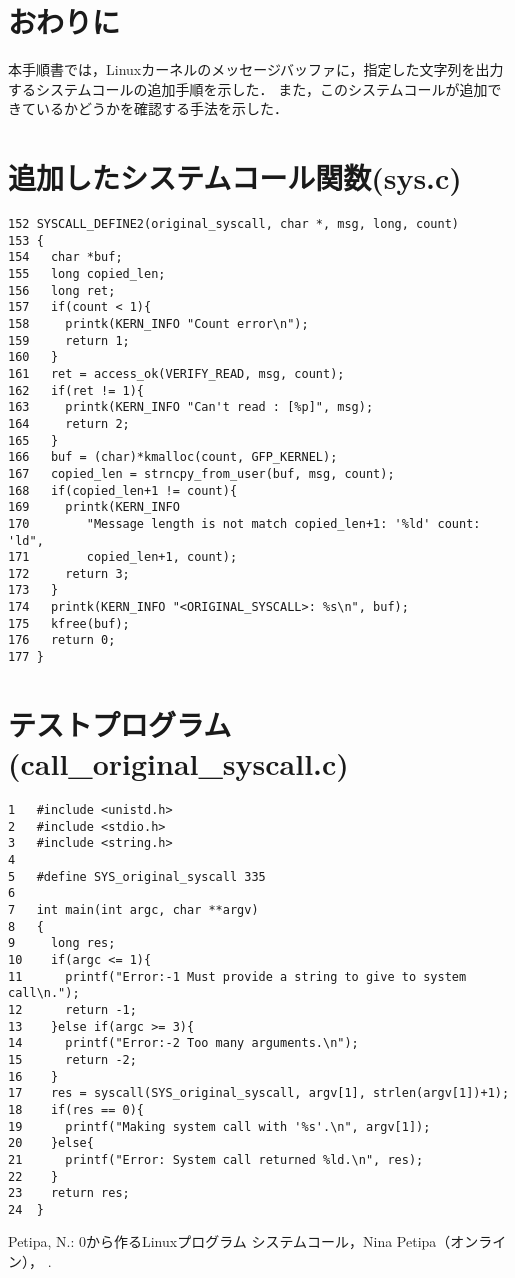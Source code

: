 \documentclass[12pt]{jsarticle}
\begin{document}
\begin{enumerate}
\end{enumerate}

\section{おわりに}
本手順書では，Linuxカーネルのメッセージバッファに，指定した文字列を出力するシステムコールの追加手順を示した．
また，このシステムコールが追加できているかどうかを確認する手法を示した．

\appendix
\section{追加したシステムコール関数(sys.c)}\label{sec:optionA}

\begin{verbatim}
152	SYSCALL_DEFINE2(original_syscall, char *, msg, long, count)
153	{
154	  char *buf;
155	  long copied_len;
156	  long ret;
157	  if(count < 1){
158	    printk(KERN_INFO "Count error\n");
159	    return 1;
160	  }
161	  ret = access_ok(VERIFY_READ, msg, count);
162	  if(ret != 1){
163	    printk(KERN_INFO "Can't read : [%p]", msg);
164	    return 2;
165	  }
166	  buf = (char)*kmalloc(count, GFP_KERNEL);
167	  copied_len = strncpy_from_user(buf, msg, count);
168	  if(copied_len+1 != count){
169	    printk(KERN_INFO
170		   "Message length is not match copied_len+1: '%ld' count: 'ld",
171		   copied_len+1, count);
172	    return 3;
173	  }
174	  printk(KERN_INFO "<ORIGINAL_SYSCALL>: %s\n", buf);
175	  kfree(buf);
176	  return 0;
177	}
\end{verbatim}

\section{テストプログラム(call\_original\_syscall.c)}\label{sec:optionB}

\begin{verbatim}
1	#include <unistd.h>
2	#include <stdio.h>
3	#include <string.h>
4	
5	#define SYS_original_syscall 335
6	
7	int main(int argc, char **argv)
8	{
9	  long res;
10	  if(argc <= 1){
11	    printf("Error:-1 Must provide a string to give to system call\n.");
12	    return -1;
13	  }else if(argc >= 3){
14	    printf("Error:-2 Too many arguments.\n");
15	    return -2;
16	  }
17	  res = syscall(SYS_original_syscall, argv[1], strlen(argv[1])+1);
18	  if(res == 0){
19	    printf("Making system call with '%s'.\n", argv[1]);
20	  }else{
21	    printf("Error: System call returned %ld.\n", res);
22	  }
23	  return res;
24	}
\end{verbatim}



% 
\begin{thebibliography}{1}

Petipa, N.: 0から作るLinuxプログラム システムコール，Nina
  Petipa（オンライン），
  .

\end{thebibliography}
\end{document}
